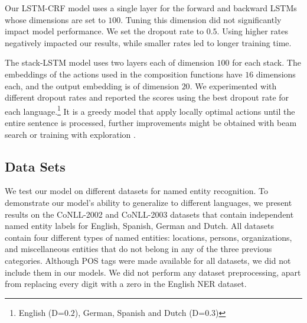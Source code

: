 \documentclass[11pt,letterpaper]{article}
\newcommand{\ignore}[1]{}
\begin{document}
Our LSTM-CRF model uses a single layer for the forward and backward LSTMs whose dimensions are set to $100$. Tuning this dimension did not significantly impact model performance. We set the dropout rate to $0.5$. Using higher rates negatively impacted our results, while smaller rates led to longer training time.

The stack-LSTM model uses two layers each of dimension $100$ for each stack. The embeddings of the actions used in the composition functions
have $16$ dimensions each, and the output embedding is of dimension $20$. We experimented with different dropout rates and reported the scores using the best dropout rate for each language.\footnote{English (D=$0.2$), German, Spanish and Dutch (D=$0.3$)} It is a greedy model that apply locally optimal actions until the entire sentence is processed, further improvements might be obtained with beam search \cite{zhang:2011} or training with exploration \cite{ballesteros-arxiv16}.


\subsection{Data Sets}

We test our model on different datasets for named entity recognition. To demonstrate our model's ability to generalize to different languages, we present results on the CoNLL-2002 and CoNLL-2003 datasets \cite{TjongKimSang:2002:ICS:1118853.1118877,TjongKimSang-DeMeulder:2003:CONLL} that contain independent named entity labels for English, Spanish, German and Dutch. All datasets contain four different types of named entities: locations, persons, organizations, and miscellaneous entities that do not belong in any of the three previous categories. \ignore{We used the CoNLL-2000 dataset to evaluate our models for chunking. }Although POS tags were made available for all datasets, we did not include them in our models. We did not perform any dataset preprocessing, apart from replacing every digit with a zero in the English NER dataset.

\end{document}
